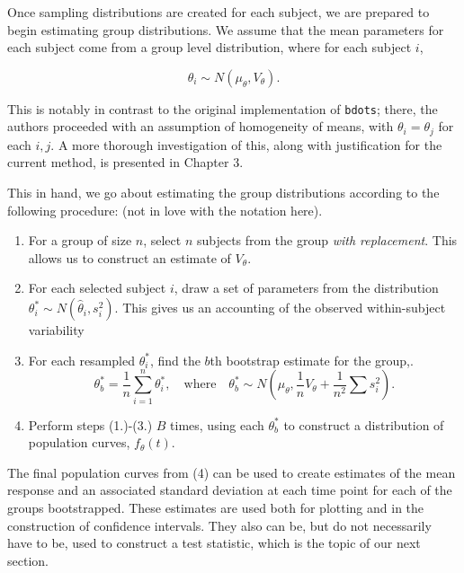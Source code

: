 \documentclass{article}
\newcommand{\xt}{\texttt}%
\begin{document}
Once sampling distributions are created for each subject, we are prepared to begin estimating group distributions. We assume that the mean parameters for each subject come from a group level distribution, where for each subject $i$,

\begin{equation}
\theta_i \sim N(\mu_{\theta}, V_{\theta}).
\end{equation}

This is notably in contrast to the original implementation of \xt{bdots}; there, the authors proceeded with an assumption of homogeneity of means, with $\theta_i = \theta_j$ for each $i, j$. A more thorough investigation of this, along with justification for the current method, is presented in Chapter 3.

This in hand, we go about estimating the group distributions according to the following procedure: (not in love with the notation here).

\begin{singlespace}
\begin{enumerate}
\vspace{-3mm}
\item For a group of size $n$, select $n$ subjects from the group \textit{with replacement}. This allows us to construct an estimate of $V_{\theta}$.
\item For each selected subject $i$, draw a set of parameters from the distribution $\theta_{i}^* \sim N(\hat{\theta}_i, s_i^2)$. This gives us an accounting of the observed within-subject variability
\item For each resampled $\theta_i^*$, find the $b$th bootstrap estimate for the group,.
\begin{equation}
\theta_b^* = \frac1n \sum_{i=1}^n \theta_i^*, \quad \text{where} \quad \theta_b^* \sim N  \left(\mu_{\theta}, \frac1n V_{\theta} + \frac{1}{n^2}\sum s_i^2 \right).
\end{equation}
\item Perform steps (1.)-(3.) $B$ times, using each $\theta_b^*$ to construct a distribution of population curves, $f_{\theta}(t)$.
\end{enumerate}
\end{singlespace}

The final population curves from (4) can be used to create estimates of the mean response and an associated standard deviation at each time point for each of the groups bootstrapped. These estimates are used both for plotting and in the construction of confidence intervals. They also can be, but do not necessarily have to be, used to construct a test statistic, which is the topic of our next section.
\end{document}
